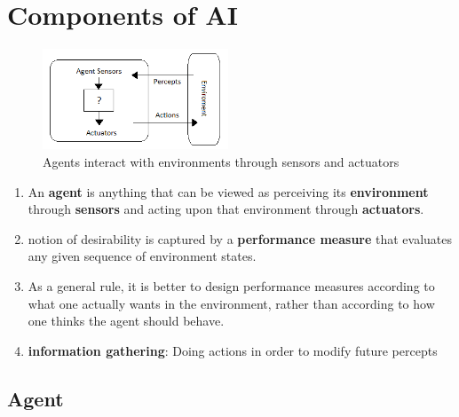 \section{Components of AI}

\begin{figure}[H]
    \centering
    \includegraphics[width=\linewidth, height=3cm, keepaspectratio]{Pictures/ai-ml/agent-env-skeleton.png}
    \caption*{Agents interact with environments through sensors and actuators \cite{aci-1}}
\end{figure}

\begin{enumerate}
    \item An \textbf{agent} is anything that can be viewed as perceiving its \textbf{environment} through \textbf{sensors} and acting upon that environment through \textbf{actuators}.

    \item notion of desirability is captured by a \textbf{performance measure} that evaluates any given sequence of environment states.

    \item As a general rule, it is better to design performance measures according to what one actually wants in the environment, rather than according to how one thinks the agent should behave. 

    \item \textbf{information gathering}: Doing actions in order to modify future percepts
\end{enumerate}


\subsection{Agent}

